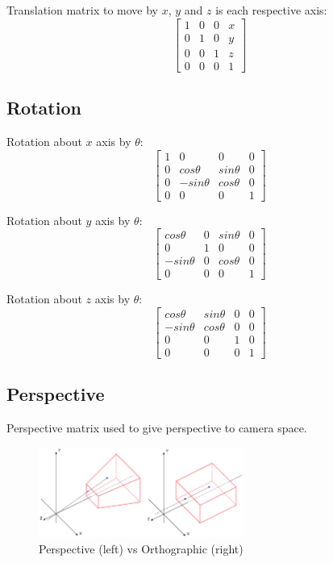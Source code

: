 \documentclass[a4paper]{article}
\begin{document}
Translation matrix to move by $x$, $y$ and $z$ is each respective axis:
\[
  \left [
    \begin{array}{cccc}
      1 & 0 & 0 & x \\
      0 & 1 & 0 & y \\
      0 & 0 & 1 & z \\
      0 & 0 & 0 & 1
    \end{array}
  \right ]
\]

\subsection{Rotation}

Rotation about $x$ axis by $\theta$:
\[
  \left [
    \begin{array}{cccc}
      1 & 0           & 0         & 0 \\
      0 & cos\theta   & sin\theta & 0 \\
      0 & -sin\theta  & cos\theta & 0 \\
      0 & 0           & 0         & 1
    \end{array}
  \right ]
\]

Rotation about $y$ axis by $\theta$:
\[
  \left [
    \begin{array}{cccc}
      cos\theta   & 0 & sin\theta & 0 \\
      0           & 1 & 0         & 0 \\
      -sin\theta  & 0 & cos\theta & 0 \\
      0           & 0 & 0         & 1
    \end{array}
  \right ]
\]

Rotation about $z$ axis by $\theta$:
\[
  \left [
    \begin{array}{cccc}
      cos\theta   & sin\theta & 0 & 0 \\
      -sin\theta  & cos\theta & 0 & 0 \\
      0           & 0         & 1 & 0 \\
      0           & 0         & 0 & 1
    \end{array}
  \right ]
\]

\subsection{Perspective}

Perspective matrix used to give perspective to camera space.

\begin{figure}[h!]
  \centering
  \includegraphics[width=0.6\textwidth]{graphics/perspective-orthographic.eps}
  \caption{Perspective (left) vs Orthographic (right)}
  \label{fig:perspective-orthographic}
\end{figure}
\FloatBarrier
\end{document}
